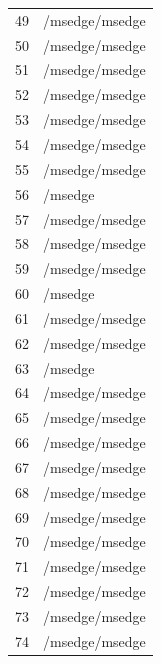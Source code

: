 \documentclass[a4paper,twoside,12pt]{book}
\begin{document}
\begin{appendices}
\begin{table}
\begin{tabular}{ll}
		49  &                                     /msedge/msedge \\
		50  &                                     /msedge/msedge \\
		51  &                                     /msedge/msedge \\
		52  &                                     /msedge/msedge \\
		53  &                                     /msedge/msedge \\
		54  &                                     /msedge/msedge \\
		55  &                                     /msedge/msedge \\
		56  &                                            /msedge \\
		57  &                                     /msedge/msedge \\
		58  &                                     /msedge/msedge \\
		59  &                                     /msedge/msedge \\
		60  &                                            /msedge \\
		61  &                                     /msedge/msedge \\
		62  &                                     /msedge/msedge \\
		63  &                                            /msedge \\
		64  &                                     /msedge/msedge \\
		65  &                                     /msedge/msedge \\
		66  &                                     /msedge/msedge \\
		67  &                                     /msedge/msedge \\
		68  &                                     /msedge/msedge \\
		69  &                                     /msedge/msedge \\
		70  &                                     /msedge/msedge \\
		71  &                                     /msedge/msedge \\
		72  &                                     /msedge/msedge \\
		73  &                                     /msedge/msedge \\
		74  &                                     /msedge/msedge \\

\end{tabular}
\end{table}
\end{appendices}
\end{document}
